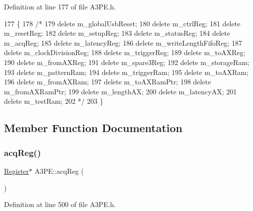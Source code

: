 Definition at line 177 of file A3\+P\+E.\+h.


\begin{DoxyCode}
177          \{
178     \textcolor{comment}{/*}
179 \textcolor{comment}{    delete m\_globalUsbReset;}
180 \textcolor{comment}{    delete m\_ctrlReg;}
181 \textcolor{comment}{    delete m\_resetReg;}
182 \textcolor{comment}{    delete m\_setupReg;}
183 \textcolor{comment}{    delete m\_statusReg;}
184 \textcolor{comment}{    delete m\_acqReg;}
185 \textcolor{comment}{    delete m\_latencyReg;}
186 \textcolor{comment}{    delete m\_writeLengthFifoReg;}
187 \textcolor{comment}{    delete m\_clockDivisionReg;}
188 \textcolor{comment}{    delete m\_triggerReg;}
189 \textcolor{comment}{    delete m\_toAXReg;}
190 \textcolor{comment}{    delete m\_fromAXReg;}
191 \textcolor{comment}{    delete m\_spare3Reg;}
192 \textcolor{comment}{    delete m\_storageRam;}
193 \textcolor{comment}{    delete m\_patternRam;}
194 \textcolor{comment}{    delete m\_triggerRam;}
195 \textcolor{comment}{    delete m\_toAXRam;}
196 \textcolor{comment}{    delete m\_fromAXRam;}
197 \textcolor{comment}{    delete m\_toAXRamPtr;}
198 \textcolor{comment}{    delete m\_fromAXRamPtr;}
199 \textcolor{comment}{    delete m\_lengthAX;}
200 \textcolor{comment}{    delete m\_latencyAX;}
201 \textcolor{comment}{    delete m\_testRam;}
202 \textcolor{comment}{    */}
203   \}
\end{DoxyCode}


\subsection{Member Function Documentation}
\mbox{\label{classA3PE_aca56dadafd70e670e75569ee03d91651}} 
\subsubsection{\texorpdfstring{acq\+Reg()}{acqReg()}}
{\footnotesize\ttfamily \hyperlink{classRegister}{Register}$\ast$ A3\+P\+E\+::acq\+Reg (\begin{DoxyParamCaption}{ }\end{DoxyParamCaption})\hspace{0.3cm}{\ttfamily [inline]}}



Definition at line 500 of file A3\+P\+E.\+h.



